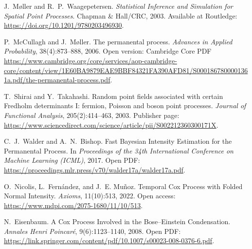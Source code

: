 \documentclass[11pt]{article}
\begin{document}

\begin{thebibliography}{10}
	
	J.~M{\o}ller and R.~P.~Waagepetersen.
	\newblock \emph{Statistical Inference and Simulation for Spatial Point Processes}.
	\newblock Chapman \& Hall/CRC, 2003.
	Available at Routledge: \url{https://doi.org/10.1201/9780203496930}.
	
	P.~McCullagh and J.~M{\o}ller.
	\newblock The permanental process.
	\newblock \emph{Advances in Applied Probability}, 38(4):873--888, 2006.
	Open version: Cambridge Core PDF \url{https://www.cambridge.org/core/services/aop-cambridge-core/content/view/1E60BA9879EAE9BBF84321FA390AFD81/S0001867800001361a.pdf/the-permanental-process.pdf}.
	
	T.~Shirai and Y.~Takahashi.
	\newblock Random point fields associated with certain Fredholm determinants I: fermion, Poisson and boson point processes.
	\newblock \emph{Journal of Functional Analysis}, 205(2):414--463, 2003.
	Publisher page: \url{https://www.sciencedirect.com/science/article/pii/S002212360300171X}.
	
	C.~J.~Walder and A.~N.~Bishop.
	\newblock Fast Bayesian Intensity Estimation for the Permanental Process.
	\newblock In \emph{Proceedings of the 34th International Conference on Machine Learning (ICML)}, 2017.
	Open PDF: \url{https://proceedings.mlr.press/v70/walder17a/walder17a.pdf}.
	
	
	O.~Nicolis, L.~Fernández, and J.~E. Muñoz.
	\newblock Temporal Cox Process with Folded Normal Intensity.
	\newblock \emph{Axioms}, 11(10):513, 2022.
	Open access: \url{https://www.mdpi.com/2075-1680/11/10/513}.
	
	N.~Eisenbaum.
	\newblock A Cox Process Involved in the Bose--Einstein Condensation.
	\newblock \emph{Annales Henri Poincaré}, 9(6):1123--1140, 2008.
	Open PDF: \url{https://link.springer.com/content/pdf/10.1007/s00023-008-0376-6.pdf}.
	
\end{thebibliography}
\end{document}
